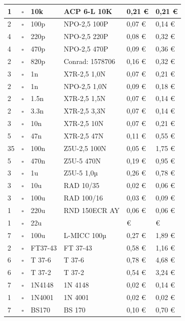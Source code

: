 \documentclass[10pt, a4paper,twoside,openright]{scrartcl}
\begin{document}
\begin{longtable}{|p{}|p{}|p{}|p{}|p{}|p{}|}
1 & $\square$ & 10k & ACP 6-L 10K & 0,21 \euro & 0,21 \euro \\ \hline
2 & $\square$ & 100p & NPO-2,5 100P & 0,07 \euro & 0,14 \euro \\
4 & $\square$ & 220p & NPO-2,5 220P & 0,08 \euro & 0,32 \euro \\
4 & $\square$ & 470p & NPO-2,5 470P & 0,09 \euro & 0,36 \euro \\
2 & $\square$ & 820p & Conrad: 1578706 & 0,16 \euro & 0,32 \euro \\
3 & $\square$ & 1n & X7R-2,5 1,0N & 0,07 \euro & 0,21 \euro \\
2 & $\square$ & 1n & NPO-2,5 1,0N & 0,09 \euro & 0,18 \euro \\
2 & $\square$ & 1.5n & X7R-2,5 1,5N & 0,07 \euro & 0,14 \euro \\
2 & $\square$ & 3.3n & X7R-2,5 3,3N & 0,07 \euro & 0,14 \euro \\
3 & $\square$ & 10n & X7R-2,5 10N & 0,07 \euro & 0,21 \euro \\
5 & $\square$ & 47n & X7R-2,5 47N & 0,11 \euro & 0,55 \euro \\
35 & $\square$ & 100n & Z5U-2,5 100N & 0,05 \euro & 1,75 \euro \\
5 & $\square$ & 470n & Z5U-5 470N & 0,19 \euro & 0,95 \euro \\
3 & $\square$ & 1u & Z5U-5 1,0µ & 0,26 \euro & 0,78 \euro \\ \hline		
3 & $\square$ & 10u & RAD 10/35 & 0,02 \euro & 0,06 \euro \\
3 & $\square$ & 100u & RAD 100/16 & 0,03 \euro & 0,09 \euro \\
1 & $\square$ & 220u & RND 150ECR AY & 0,06 \euro & 0,06 \euro \\ \hline
1 & $\square$ & 22u & & \euro & \euro \\
7 & $\square$ & 100u & L-MICC 100µ & 0,27 \euro & 1,89 \euro \\ \hline
2 & $\square$ & FT37-43 & FT 37-43 & 0,58 \euro & 1,16 \euro \\
6 & $\square$ & T 37-6 & T 37-6 & 0,78 \euro & 4,68 \euro \\
6 & $\square$ & T 37-2 & T 37-2 & 0,54 \euro & 3,24 \euro \\ \hline
7 & $\square$ & 1N4148 & 1N 4148 & 0,02 \euro & 0,14 \euro \\
1 & $\square$ & 1N4001 & 1N 4001 & 0,02 \euro & 0,02 \euro \\
7 & $\square$ & BS170 & BS 170 & 0,10 \euro & 0,70 \euro \\

\end{longtable}
\end{document}

